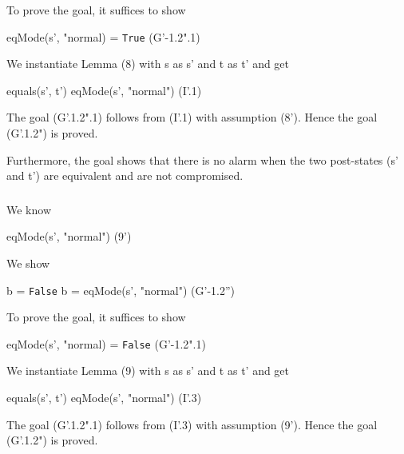 \documentclass[conference]{IEEEtran}
\begin{document}
\noindent To prove the goal, it suffices to show

\begin{center}
eqMode(s', "normal) = \texttt{True}  \hspace*{2.5cm} (G'-1.2".1)
\end{center}

\noindent We instantiate Lemma (8) with
s as s' and t as t' and get

\begin{center}
equals(s', t')  eqMode(s', "normal")  \hspace*{1cm} (I'.1)
\end{center}

The goal (G'.1.2".1) follows from (I'.1) with assumption (8'). Hence the goal (G'.1.2") is proved. 

Furthermore, the goal shows that there is no alarm when the two post-states (s' and t') are
equivalent and are not compromised.

\subsubsection*{} 

\noindent We know

\begin{center}
 eqMode(s', "normal")  \hspace*{2cm} (9')
\end{center}

\noindent We show

\begin{center}
 b = \texttt{False}  b = eqMode(s', "normal")  \hspace*{1cm} (G'-1.2'')
\end{center}

\noindent To prove the goal, it suffices to show

\begin{center}
eqMode(s', "normal) = \texttt{False}  \hspace*{2.3cm} (G'-1.2".1)
\end{center}

\noindent We instantiate Lemma (9) with
s as s' and t as t' and get

\begin{center}
 equals(s', t')   eqMode(s', "normal")  \hspace*{1cm} (I'.3)
\end{center}

The goal (G'.1.2".1) follows from (I'.3) with assumption (9'). Hence the goal (G'.1.2") is proved. 
\end{document}
